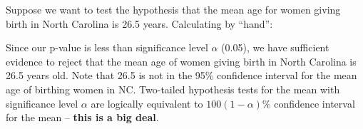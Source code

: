 \documentclass[]{book}
\newenvironment{Shaded}{\begin{snugshade}}{\end{snugshade}}
\newcommand{\CommentTok}[1]{\textcolor[rgb]{0.56,0.35,0.01}{\textit{#1}}}
\newcommand{\DataTypeTok}[1]{\textcolor[rgb]{0.13,0.29,0.53}{#1}}
\newcommand{\DecValTok}[1]{\textcolor[rgb]{0.00,0.00,0.81}{#1}}
\newcommand{\FloatTok}[1]{\textcolor[rgb]{0.00,0.00,0.81}{#1}}
\newcommand{\KeywordTok}[1]{\textcolor[rgb]{0.13,0.29,0.53}{\textbf{#1}}}
\newcommand{\NormalTok}[1]{#1}
\newcommand{\OperatorTok}[1]{\textcolor[rgb]{0.81,0.36,0.00}{\textbf{#1}}}
\newcommand{\OtherTok}[1]{\textcolor[rgb]{0.56,0.35,0.01}{#1}}
\newcommand{\StringTok}[1]{\textcolor[rgb]{0.31,0.60,0.02}{#1}}
\theoremstyle{definition}
\theoremstyle{definition}
\theoremstyle{definition}
\theoremstyle{remark}
\begin{document}
\begin{Shaded}
\end{Shaded}

Suppose we want to test the hypothesis that the mean age for women
giving birth in North Carolina is 26.5 years. Calculating by ``hand'':

\begin{Shaded}
\end{Shaded}

Since our p-value is less than significance level \(\alpha\) (0.05), we
have sufficient evidence to reject that the mean age of women giving
birth in North Carolina is 26.5 years old. Note that 26.5 is not in the
95\% confidence interval for the mean age of birthing women in NC.
Two-tailed hypothesis tests for the mean with significance level
\(\alpha\) are logically equivalent to \(100(1-\alpha)\%\) confidence
interval for the mean -- \textbf{this is a big deal}.
\end{document}
